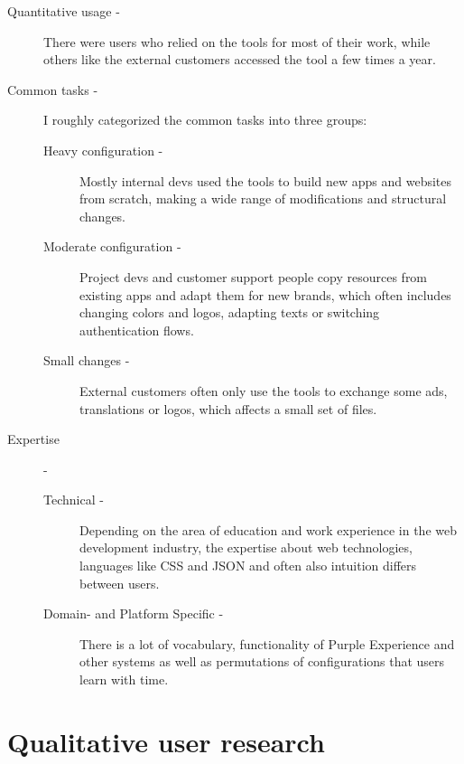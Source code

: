 \begin{description}
  \item[Quantitative usage -] There were users who relied on the tools for most of their work, while others like the external customers accessed the tool a few times a year.
  \item[Common tasks -] I roughly categorized the common tasks into three groups:
  \begin{description}
    \item[Heavy configuration -] Mostly internal devs used the tools to build new apps and websites from scratch, making a wide range of modifications and structural changes.
    \item[Moderate configuration -] Project devs and customer support people copy resources from existing apps and adapt them for new brands, which often includes changing colors and logos, adapting texts or switching authentication flows.
    \item[Small changes -] External customers often only use the tools to exchange some ads, translations or logos, which affects a small set of files.
  \end{description}
  \item[Expertise] -
  \begin{description}
    \item[Technical -] Depending on the area of education and work experience in the web development industry, the expertise about web technologies, languages like CSS and JSON and often also intuition differs between users.
    \item[Domain- and Platform Specific -] There is a lot of vocabulary, functionality of Purple Experience and other systems as well as permutations of configurations that users learn with time.
  \end{description}
\end{description}

\section{Qualitative user research}

